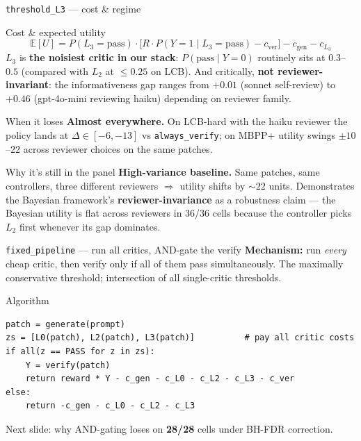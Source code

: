 \documentclass[10pt]{beamer}
\newcommand{\good}[1]{\textcolor{accentGreen}{\textbf{#1}}}
\newcommand{\bad}[1]{\textcolor{accentRed}{\textbf{#1}}}
\newcommand{\warn}[1]{\textcolor{accentOrange}{\textbf{#1}}}
\newcommand{\info}[1]{\textcolor{primaryBlue}{\textbf{#1}}}
\begin{document}
\begin{frame}[fragile]{\texttt{threshold\_L3} --- cost \& regime}
\begin{block}{Cost \& expected utility}
\footnotesize
\[
\mathbb{E}[U] = P(L_3{=}\text{pass}) \cdot \bigl[R \cdot P(Y{=}1\!\mid\! L_3{=}\text{pass})
- c_\text{ver}\bigr] - c_\text{gen} - c_{L_3}
\]
$L_3$ is \textbf{the noisiest critic in our stack}: $P(\text{pass}\mid Y{=}0)$
routinely sits at $0.3$--$0.5$ (compared with $L_2$ at $\leq 0.25$ on LCB).
And critically, \warn{not reviewer-invariant}: the informativeness gap
ranges from $+0.01$ (sonnet self-review) to $+0.46$ (gpt-4o-mini reviewing
haiku) depending on reviewer family.
\end{block}

\begin{alertblock}{When it loses}
\bad{Almost everywhere.} On LCB-hard with the haiku reviewer the policy
lands at $\Delta \in [-6,-13]$ vs \texttt{always\_verify}; on MBPP+ utility
swings $\pm 10$--$22$ across reviewer choices on the same patches.
\end{alertblock}

\begin{exampleblock}{Why it's still in the panel}
\warn{High-variance baseline.} Same patches, same controllers, three
different reviewers $\Rightarrow$ utility shifts by $\sim 22$ units.
Demonstrates the Bayesian framework's \good{reviewer-invariance} as a
robustness claim --- the Bayesian utility is flat across reviewers in
36/36 cells because the controller picks $L_2$ first whenever its gap
dominates.
\end{exampleblock}
\end{frame}

\begin{frame}[fragile]{\texttt{fixed\_pipeline} --- run all critics, AND-gate the verify}
\info{Mechanism:} run \emph{every} cheap critic, then verify only if all of
them pass simultaneously. The maximally conservative threshold; intersection
of all single-critic thresholds.

\begin{block}{Algorithm}
\begin{lstlisting}
patch = generate(prompt)
zs = [L0(patch), L2(patch), L3(patch)]          # pay all critic costs
if all(z == PASS for z in zs):
    Y = verify(patch)
    return reward * Y - c_gen - c_L0 - c_L2 - c_L3 - c_ver
else:
    return -c_gen - c_L0 - c_L2 - c_L3
\end{lstlisting}
\end{block}

\textcolor{softGrey}{\scriptsize Next slide: why AND-gating loses on
\textbf{28/28} cells under BH-FDR correction.}
\end{frame}
\end{document}
